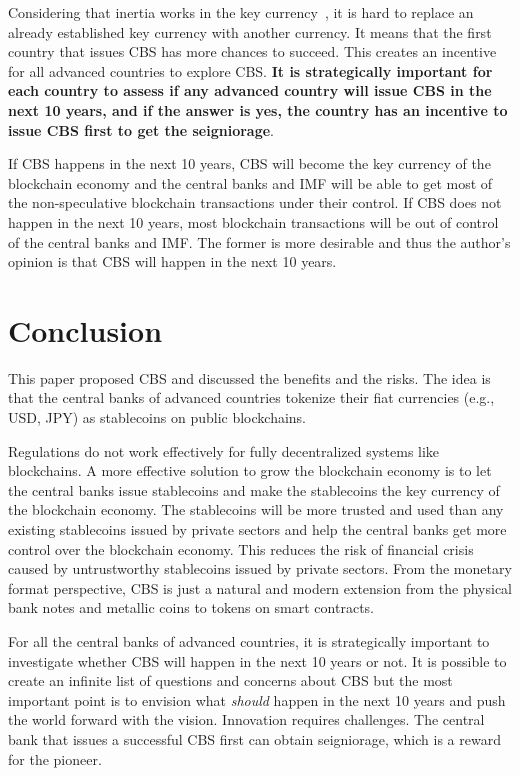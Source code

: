 \documentclass[dvipdfmx,a4paper]{article}
\begin{document}
Considering that inertia works in the key currency~\cite{goldberg2010international}, it is hard to replace an already established key currency with another currency. It means that the first country that issues CBS has more chances to succeed. This creates an incentive for all advanced countries to explore CBS. \textbf{It is strategically important for each country to assess if any advanced country will issue CBS in the next 10 years, and if the answer is yes, the country has an incentive to issue CBS first to get the seigniorage}.

If CBS happens in the next 10 years, CBS will become the key currency of the blockchain economy and the central banks and IMF will be able to get most of the non-speculative blockchain transactions under their control. If CBS does not happen in the next 10 years, most blockchain transactions will be out of control of the central banks and IMF. The former is more desirable and thus the author's opinion is that CBS will happen in the next 10 years.

\section{Conclusion}

This paper proposed CBS and discussed the benefits and the risks. The idea is that the central banks of advanced countries tokenize their fiat currencies (e.g., USD, JPY) as stablecoins on public blockchains.

Regulations do not work effectively for fully decentralized systems like blockchains. A more effective solution to grow the blockchain economy is to let the central banks issue stablecoins and make the stablecoins the key currency of the blockchain economy. The stablecoins will be more trusted and used than any existing stablecoins issued by private sectors and help the central banks get more control over the blockchain economy. This reduces the risk of financial crisis caused by untrustworthy stablecoins issued by private sectors. From the monetary format perspective, CBS is just a natural and modern extension from the physical bank notes and metallic coins to tokens on smart contracts.

For all the central banks of advanced countries, it is strategically important to investigate whether CBS will happen in the next 10 years or not. It is possible to create an infinite list of questions and concerns about CBS but the most important point is to envision what \textit{should} happen in the next 10 years and push the world forward with the vision. Innovation requires challenges. The central bank that issues a successful CBS first can obtain seigniorage, which is a reward for the pioneer.



\end{document}
